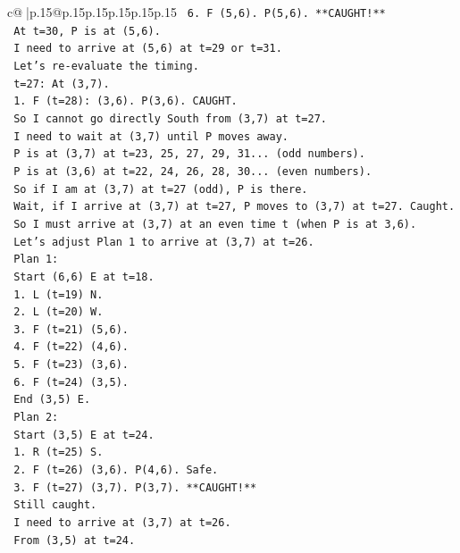 \documentclass{article}
\begin{document}
{\begin{supertabular}{c@{$\;$}|p{.15\linewidth}@{}p{.15\linewidth}p{.15\linewidth}p{.15\linewidth}p{.15\linewidth}p{.15\linewidth}}
{{{\texttt{   6. F (5,6). P(5,6). **CAUGHT!**} \\
\texttt{   At t=30, P is at (5,6).} \\
\texttt{   I need to arrive at (5,6) at t=29 or t=31.} \\
\texttt{   Let's re{-}evaluate the timing.} \\
\texttt{   t=27: At (3,7).} \\
\texttt{   1. F (t=28): (3,6). P(3,6). CAUGHT.} \\
\texttt{   So I cannot go directly South from (3,7) at t=27.} \\
\texttt{   I need to wait at (3,7) until P moves away.} \\
\texttt{   P is at (3,7) at t=23, 25, 27, 29, 31... (odd numbers).} \\
\texttt{   P is at (3,6) at t=22, 24, 26, 28, 30... (even numbers).} \\
\texttt{   So if I am at (3,7) at t=27 (odd), P is there.} \\
\texttt{   Wait, if I arrive at (3,7) at t=27, P moves to (3,7) at t=27. Caught.} \\
\texttt{   So I must arrive at (3,7) at an even time t (when P is at 3,6).} \\
\texttt{   Let's adjust Plan 1 to arrive at (3,7) at t=26.} \\
\texttt{   Plan 1:} \\
\texttt{   Start (6,6) E at t=18.} \\
\texttt{   1. L (t=19) N.} \\
\texttt{   2. L (t=20) W.} \\
\texttt{   3. F (t=21) (5,6).} \\
\texttt{   4. F (t=22) (4,6).} \\
\texttt{   5. F (t=23) (3,6).} \\
\texttt{   6. F (t=24) (3,5).} \\
\texttt{   End (3,5) E.} \\
\texttt{   Plan 2:} \\
\texttt{   Start (3,5) E at t=24.} \\
\texttt{   1. R (t=25) S.} \\
\texttt{   2. F (t=26) (3,6). P(4,6). Safe.} \\
\texttt{   3. F (t=27) (3,7). P(3,7). **CAUGHT!**} \\
\texttt{   Still caught.} \\
\texttt{   I need to arrive at (3,7) at t=26.} \\
\texttt{   From (3,5) at t=24.} \\
}}}
\end{supertabular}}
\end{document}
